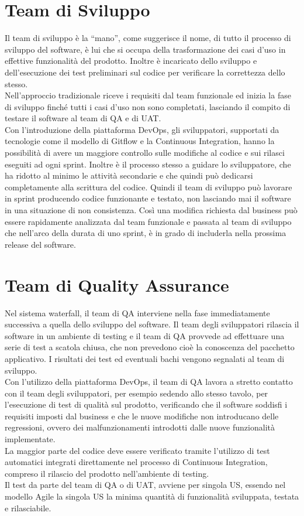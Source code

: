 \documentclass[a4paper, 12pt]{report}
\numberwithin{equation}{section}
\begin{document}
\section{Team di Sviluppo}
Il team di sviluppo è la “mano”, come suggerisce il nome, di tutto il processo di sviluppo del software, è lui che si occupa della trasformazione dei casi d’uso in effettive funzionalità del prodotto. Inoltre è incaricato dello sviluppo e dell’esecuzione dei test preliminari sul codice per verificare la correttezza dello stesso.\\
Nell’approccio tradizionale riceve i requisiti dal team funzionale ed inizia la fase di sviluppo finché tutti i casi d’uso non sono completati, lasciando il compito di testare il software al team di QA e di UAT.\\
Con l’introduzione della piattaforma DevOps, gli sviluppatori, supportati da tecnologie come il modello di Gitflow e la Continuous Integration, hanno la possibilità di avere un maggiore controllo sulle modifiche al codice e sui rilasci eseguiti ad ogni sprint. Inoltre è il processo stesso a guidare lo sviluppatore, che ha ridotto al minimo le attività secondarie e che quindi può dedicarsi completamente alla scrittura del codice.
Quindi il team di sviluppo può lavorare in sprint producendo codice funzionante e testato, non lasciando mai il software in una situazione di non consistenza. Così una modifica richiesta dal business può essere rapidamente analizzata dal team funzionale e passata al team di sviluppo che nell’arco della durata di uno sprint, è in grado di includerla nella prossima release del software.

\section{Team di Quality Assurance}
Nel sistema waterfall, il team di QA interviene nella fase immediatamente successiva a quella dello sviluppo del software. Il team degli sviluppatori rilascia il software in un ambiente di testing e il team di QA provvede ad effettuare una serie di test a scatola chiusa, che non prevedono cioè la conoscenza del pacchetto applicativo. I risultati dei test ed eventuali bachi vengono segnalati al team di sviluppo.\\
Con l’utilizzo della piattaforma DevOps, il team di QA lavora a stretto contatto con il team degli sviluppatori, per esempio sedendo allo stesso tavolo, per l’esecuzione di test di qualità sul prodotto, verificando che il software soddisfi i requisiti imposti dal business e che le nuove modifiche non introducano delle regressioni, ovvero dei malfunzionamenti introdotti dalle nuove funzionalità implementate.\\
La maggior parte del codice deve essere verificato tramite l’utilizzo di test automatici integrati direttamente nel processo di Continuous Integration, compreso il rilascio del prodotto nell’ambiente di testing.\\
Il test da parte del team di QA o di UAT, avviene per singola US, essendo nel modello Agile la singola US la minima quantità di funzionalità sviluppata, testata e rilasciabile. 
\end{document}
